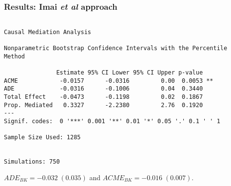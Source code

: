 \documentclass[11pt,english,dvipsnames,aspectratio=169,handout]{beamer}\usepackage[]{graphicx}\usepackage[]{xcolor}
\makeatletter
\newenvironment{kframe}{%
 \def\at@end@of@kframe{}%
 \ifinner\ifhmode%
  \def\at@end@of@kframe{\end{minipage}}%
  \begin{minipage}{\columnwidth}%
 \fi\fi%
 \def\FrameCommand##1{\hskip\@totalleftmargin \hskip-\fboxsep
 \colorbox{shadecolor}{##1}\hskip-\fboxsep
     \hskip-\linewidth \hskip-\@totalleftmargin \hskip\columnwidth}%
 \MakeFramed {\advance\hsize-\width
   \@totalleftmargin\z@ \linewidth\hsize
   \@setminipage}}%
 {\par\unskip\endMakeFramed%
 \at@end@of@kframe}
\newenvironment{knitrout}{}{} %
\makeatother
\begin{document}
\begin{frame}[fragile]
  \frametitle{Results: Imai \textit{et al} approach}

\begin{knitrout}\tiny
{}\color{fgcolor}\begin{kframe}
\begin{verbatim}

Causal Mediation Analysis 

Nonparametric Bootstrap Confidence Intervals with the Percentile Method

               Estimate 95% CI Lower 95% CI Upper p-value   
ACME            -0.0157      -0.0316         0.00  0.0053 **
ADE             -0.0316      -0.1006         0.04  0.3440   
Total Effect    -0.0473      -0.1198         0.02  0.1867   
Prop. Mediated   0.3327      -2.2380         2.76  0.1920   
---
Signif. codes:  0 '***' 0.001 '**' 0.01 '*' 0.05 '.' 0.1 ' ' 1

Sample Size Used: 1285 


Simulations: 750 
\end{verbatim}
\end{kframe}
\end{knitrout}

$ADE_{BK} = -0.032\; (0.035)$ and $ACME_{BK} = -0.016\; (0.007)$.

\end{frame}


\end{document}
